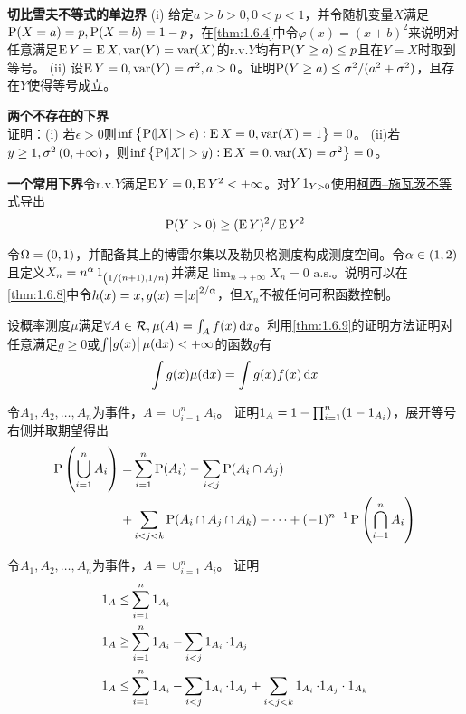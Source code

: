 \documentclass[../main.tex]{subfiles}
\begin{document}
\begin{exercise}
\item \textbf{切比雪夫不等式的单边界}
(i) 给定\(a>b>0,0<p<1\)，并令随机变量\(X\)满足\(\operatorname{\mathrm{P}}(X=a)=p,\operatorname{\mathrm{P}}(X=b)=1-p\)，在\autoref{thm:1.6.4}中令\(\varphi(x)=(x+b)^2\)来说明对任意满足\(\operatorname{E} Y=\operatorname{E} X, \operatorname{var}(Y)=\operatorname{var}(X)\)的r.v.\(Y\)均有\(\operatorname{\mathrm{P}}(Y\geq a)\leq p\)且在\(Y=X\)时取到等号。
(ii) 设\(\operatorname{E} Y=0,\operatorname{var}(Y)=\sigma^2,a>0\)。证明\(\operatorname{\mathrm{P}}(Y\geq a)\leq \sigma^2/(a^2+\sigma^2)\)，且存在\(Y\)使得等号成立。
\item \textbf{两个不存在的下界}\\
证明：(i) 若\(\epsilon>0\)则\(\inf\cbr{\probP(\envert{X}>\epsilon):\E X=0,\Var(X)=1}=0\)。
(ii)若\(y\geq1, \sigma^2\intoo{0,+\infty}\)，则\(\inf\cbr{\probP(\envert{X}>y):\E X=0,\Var(X)=\sigma^2}=0\)。
\item \textbf{一个常用下界}令r.v.\(Y\)满足\(\operatorname{E} Y=0,\operatorname{E} Y^2<+\infty\)。对\(Y\operatorname{1}_{Y>0}\)使用\hyperref[thm:1.5.2]{柯西--施瓦茨不等式}导出
\[\operatorname{\mathrm{P}}(Y>0)\geq (\operatorname{E} Y)^2/\operatorname{E} Y^2\]
\item 令\(\Omega=\intoo{0,1}\)，并配备其上的博雷尔集以及勒贝格测度构成测度空间。令\(\alpha\in\intoo{1,2}\)且定义\(X_n=n^{\alpha}\indicator_{\intoo{1/(n+1),1/n}}\)并满足\(\lim_{n\rightarrow+\infty}X_n=0 \text{ a.s.}\)。说明可以在\autoref{thm:1.6.8}中令\(h(x)=x,g(x)=\envert{x}^{2/\alpha}\)，但\(X_n\)不被任何可积函数控制。
\item 设概率测度\(\mu\)满足\(\forall A\in\mathcal{R}, \mu(A)=\int_Af(x)\dif x\)。利用\autoref{thm:1.6.9}的证明方法证明对任意满足\(g\geq0\)或\(\int \envert{g(x)}\mu(\dif x)<+\infty\)的函数\(g\)有
\[\int g(x)\mu(\dif x)=\int g(x)f(x)\dif x\]
\item {} 令\(A_1,A_2,\dots,A_n\)为事件，\(A=\cup_{i=1}^nA_i\)。
证明\(\operatorname{1}_A=1-\prod_{i=1}^n(1-\operatorname{1}_{A_{i}})\)，展开等号右侧并取期望得出
\[\begin{split}
	\probP\del{\bigcup_{i=1}^n A_i}=&\sum_{i=1}^n\probP(A_i)-\sum_{i<j}\probP(A_i\cap A_j)\\
	+&\sum_{i<j<k}\probP(A_i\cap A_j\cap A_k)-\dots+(-1)^{n-1}\probP\del{\bigcap_{i=1}^nA_i}
\end{split}\]
\item {}
令\(A_1,A_2,\dots,A_n\)为事件，\(A=\cup_{i=1}^nA_i\)。
证明
\begin{align*}
	\indicator_A\leq&\sum_{i=1}^n\indicator_{A_i}\\
	\indicator_A\geq&\sum_{i=1}^n\indicator_{A_i}-\sum_{i<j}\indicator_{A_i}\cdot1_{A_j}\\
	\indicator_A\leq&\sum_{i=1}^n\indicator_{A_i}-\sum_{i<j}\indicator_{A_i}\cdot1_{A_j}+\sum_{i<j<k}\indicator_{A_i}\cdot1_{A_j}\cdot 1_{A_k}\\

\end{align*}
\end{exercise}
\end{document}

